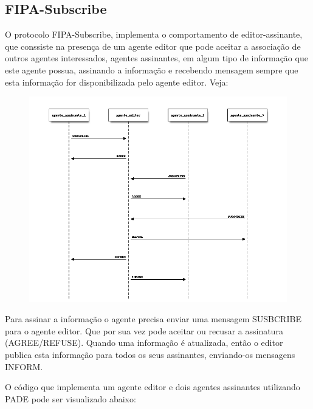 \documentclass[letterpaper,10pt,brazil]{sphinxmanual}
\begin{document}
\subsection{FIPA-Subscribe}
\label{user/protocolos:fipa-subscribe}\label{user/protocolos:id3}
O protocolo FIPA-Subscribe, implementa o comportamento de editor-assinante, que conssiste na presença de um agente editor que pode aceitar a associação de outros agentes interessados, agentes assinantes, em algum tipo de informação que este agente possua, assinando a informação e recebendo mensagem sempre que esta informação for disponibilizada pelo agente editor. Veja:
\begin{figure}[htbp]
\centering

\includegraphics[width=4.5in]{seq_diag_subscribe.png}
\end{figure}

Para assinar a informação o agente precisa enviar uma mensagem SUSBCRIBE para o agente editor. Que por sua vez pode aceitar ou recusar a assinatura (AGREE/REFUSE). Quando uma informação é atualizada, então o editor publica esta informação para todos os seus assinantes, enviando-os mensagens INFORM.

O código que implementa um agente editor e dois agentes assinantes utilizando PADE pode ser visualizado abaixo:
\end{document}
